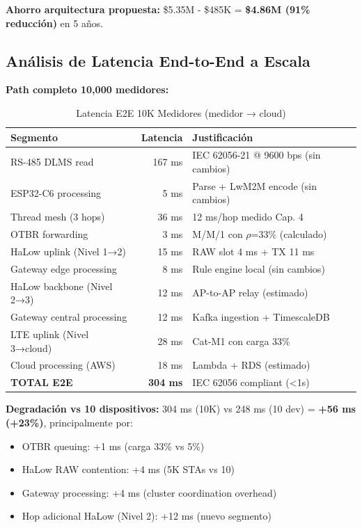 \textbf{Ahorro arquitectura propuesta:} \$5.35M - \$485K = \textbf{\$4.86M (91\% reducción)} en 5 años.

\subsection{Análisis de Latencia End-to-End a Escala}

\textbf{Path completo 10,000 medidores:}

\begin{table}[h]
\centering
\caption{Latencia E2E 10K Medidores (medidor → cloud)}
\label{tab:latency-10k}
\begin{tabular}{|l|r|l|}
\hline
\textbf{Segmento} & \textbf{Latencia} & \textbf{Justificación} \\
\hline
RS-485 DLMS read & 167 ms & IEC 62056-21 @ 9600 bps (sin cambios) \\
\hline
ESP32-C6 processing & 5 ms & Parse + LwM2M encode (sin cambios) \\
\hline
Thread mesh (3 hops) & 36 ms & 12 ms/hop medido Cap. 4 \\
\hline
OTBR forwarding & 3 ms & M/M/1 con $\rho$=33\% (calculado) \\
\hline
HaLow uplink (Nivel 1→2) & 15 ms & RAW slot 4 ms + TX 11 ms \\
\hline
Gateway edge processing & 8 ms & Rule engine local (sin cambios) \\
\hline
HaLow backbone (Nivel 2→3) & 12 ms & AP-to-AP relay (estimado) \\
\hline
Gateway central processing & 12 ms & Kafka ingestion + TimescaleDB \\
\hline
LTE uplink (Nivel 3→cloud) & 28 ms & Cat-M1 con carga 33\% \\
\hline
Cloud processing (AWS) & 18 ms & Lambda + RDS (estimado) \\
\hline
\hline
\textbf{TOTAL E2E} & \textbf{304 ms} & IEC 62056 compliant (<1s) \\
\hline
\end{tabular}
\end{table}

\textbf{Degradación vs 10 dispositivos:} 304 ms (10K) vs 248 ms (10 dev) = \textbf{+56 ms (+23\%)}, principalmente por:
\begin{itemize}
\item OTBR queuing: +1 ms (carga 33\% vs 5\%)
\item HaLow RAW contention: +4 ms (5K STAs vs 10)
\item Gateway processing: +4 ms (cluster coordination overhead)
\item Hop adicional HaLow (Nivel 2): +12 ms (nuevo segmento)
\end{itemize}

